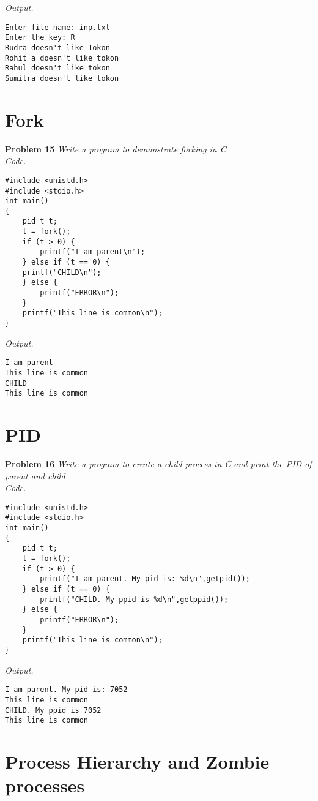 \documentclass[12pt]{article}
\begin{document}
\textit{Output.}
\begin{lstlisting}
Enter file name: inp.txt
Enter the key: R
Rudra doesn't like Tokon
Rohit a doesn't like tokon
Rahul doesn't like tokon
Sumitra doesn't like tokon
\end{lstlisting}

\section{Fork}

\textbf{Problem 15 } \textit{Write a program to demonstrate forking in C}\\

\textit{Code.}

\begin{lstlisting}
#include <unistd.h>
#include <stdio.h>
int main()
{
	pid_t t;
	t = fork();
	if (t > 0) {
		printf("I am parent\n");
	} else if (t == 0) {
	printf("CHILD\n");
	} else {
		printf("ERROR\n");
	}
	printf("This line is common\n");
}
\end{lstlisting}

\textit{Output.}
\begin{lstlisting}
I am parent
This line is common
CHILD
This line is common
\end{lstlisting}

\section{PID}

\textbf{Problem 16} \textit{Write a program to create a child process in C and print the PID of parent and child}\\

\textit{Code.}

\begin{lstlisting}
#include <unistd.h>
#include <stdio.h>
int main()
{
	pid_t t;
	t = fork();
	if (t > 0) {
		printf("I am parent. My pid is: %d\n",getpid());
	} else if (t == 0) {
		printf("CHILD. My ppid is %d\n",getppid());
	} else {
		printf("ERROR\n");
	}
	printf("This line is common\n");
}
\end{lstlisting}

\textit{Output.}
\begin{lstlisting}
I am parent. My pid is: 7052
This line is common
CHILD. My ppid is 7052
This line is common
\end{lstlisting}

\section{Process Hierarchy and Zombie processes}
\end{document}
